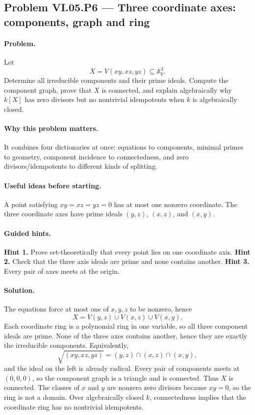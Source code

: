 \subsection*{Problem VI.05.P6 --- Three coordinate axes: components, graph and ring}
\label{prob:vi05-p6}
\paragraph{Problem.}
Let
\[
X=V(xy,xz,yz)\subseteq\mathbb A_k^3.
\]
Determine all irreducible components and their prime ideals.  Compute the component graph,
prove that \(X\) is connected, and explain algebraically why \(k[X]\) has zero divisors but
no nontrivial idempotents when \(k\) is algebraically closed.
\ifdefined\FullProblemDossiers
\paragraph{Why this problem matters.}
It combines four dictionaries at once: equations to components, minimal primes to geometry,
component incidence to connectedness, and zero divisors/idempotents to different kinds of
splitting.
\paragraph{Useful ideas before starting.}
A point satisfying \(xy=xz=yz=0\) has at most one nonzero coordinate.  The three coordinate
axes have prime ideals \((y,z)\), \((x,z)\), and \((x,y)\).
\paragraph{Guided hints.}
\textbf{Hint 1.} Prove set-theoretically that every point lies on one coordinate axis.
\textbf{Hint 2.} Check that the three axis ideals are prime and none contains another.
\textbf{Hint 3.} Every pair of axes meets at the origin.
\paragraph{Solution.}
The equations force at most one of \(x,y,z\) to be nonzero, hence
\[
X=V(y,z)\cup V(x,z)\cup V(x,y).
\]
Each coordinate ring is a polynomial ring in one variable, so all three component ideals are
prime.  None of the three axes contains another, hence they are exactly the irreducible
components.  Equivalently,
\[
\sqrt{(xy,xz,yz)}=(y,z)\cap(x,z)\cap(x,y),
\]
and the ideal on the left is already radical.
Every pair of components meets at \((0,0,0)\), so the component graph is a triangle and is
connected.  Thus \(X\) is connected.  The classes of \(x\) and \(y\) are nonzero zero
divisors because \(xy=0\), so the ring is not a domain.  Over algebraically closed \(k\),
connectedness implies that the coordinate ring has no nontrivial idempotents.
